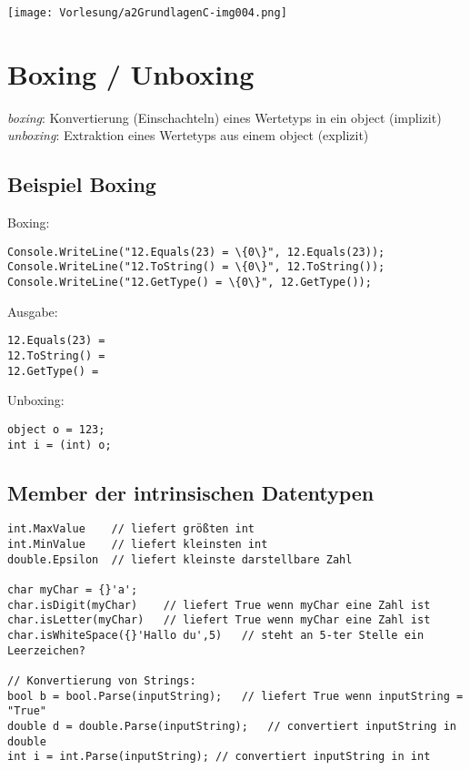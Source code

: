 \begin{center}
\texttt{[image: Vorlesung/a2GrundlagenC-img004.png]}
\end{center}

\section{Boxing / Unboxing}

\emph{boxing}: Konvertierung (Einschachteln) eines Wertetyps in ein object (implizit)\\
\emph{unboxing}: Extraktion eines Wertetyps aus einem object (explizit)

\subsection*{Beispiel Boxing}

Boxing:
\begin{lstlisting}[language={[Sharp]C}]
Console.WriteLine("12.Equals(23) = \{0\}", 12.Equals(23));
Console.WriteLine("12.ToString() = \{0\}", 12.ToString());
Console.WriteLine("12.GetType() = \{0\}", 12.GetType());
\end{lstlisting}
Ausgabe:
\begin{lstlisting}[language={[Sharp]C}]
12.Equals(23) =
12.ToString() =
12.GetType() = 
\end{lstlisting}
Unboxing:
\begin{lstlisting}[language={[Sharp]C}]
object o = 123;
int i = (int) o;
\end{lstlisting}

\subsection{Member der intrinsischen Datentypen}

\begin{lstlisting}[language={[Sharp]C}]
int.MaxValue	// liefert größten int
int.MinValue	// liefert kleinsten int
double.Epsilon	// liefert kleinste darstellbare Zahl

char myChar = {}'a';
char.isDigit(myChar)	// liefert True wenn myChar eine Zahl ist
char.isLetter(myChar)	// liefert True wenn myChar eine Zahl ist
char.isWhiteSpace({}'Hallo du',5)	// steht an 5-ter Stelle ein Leerzeichen?

// Konvertierung von Strings:
bool b = bool.Parse(inputString);	// liefert True wenn inputString = "True"
double d = double.Parse(inputString);	// convertiert inputString in double
int i = int.Parse(inputString);	// convertiert inputString in int
\end{lstlisting}

